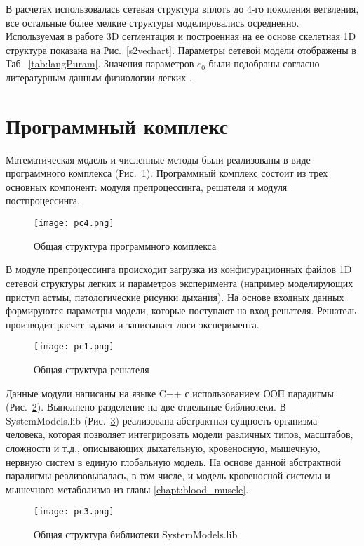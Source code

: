 В расчетах использовалась сетевая структура вплоть до 4-го поколения ветвления, все остальные более мелкие структуры моделировались осредненно. Используемая в работе 3D сегментация и построенная на ее основе скелетная 1D структура показана на  Рис.~\ref{s2vechart}. Параметры сетевой модели отображены в Таб.~\ref{tab:langPuram}. Значения параметров $c_{0} $ были подобраны согласно литературным данным физиологии легких \cite{schmidt,Mead1961}.

\section{Программный комплекс}
\label{lung:soft}
Математическая модель и численные методы были реализованы в виде программного комплекса (Рис.~\ref{fig:soft_lung}). Программный комплекс состоит из трех основных компонент: модуля препроцессинга, решателя и модуля постпроцессинга. 
\begin{figure}[!ht]
	\centering
	\texttt{[image: pc4.png]}
	\caption{Общая структура программного комплекса} \label{fig:soft_lung}
\end{figure}
В модуле препроцессинга происходит загрузка из конфигурационных файлов 1D сетевой структуры легких и параметров эксперимента (например моделирующих приступ астмы, патологические рисунки дыхания). На основе входных данных формируются параметры модели, которые поступают на вход решателя. Решатель производит расчет задачи и записывает логи эксперимента.
\begin{figure}[!ht]
	\centering
	\texttt{[image: pc1.png]}
	\caption{Общая структура решателя} \label{fig:soft_solver}
\end{figure}
Данные модули написаны на языке C++ с использованием ООП парадигмы (Рис.~\ref{fig:soft_solver}). Выполнено разделение на две отдельные библиотеки.  В SystemModels.lib (Рис.~\ref{fig:soft_systems}) реализована абстрактная сущность организма человека, которая позволяет интегрировать  модели различных типов, масштабов, сложности и т.д., описывающих дыхательную, кровеносную, мышечную, нервную систем в единую глобальную модель. На основе данной абстрактной парадигмы реализовывалась, в том числе, и модель кровеносной системы и мышечного метаболизма из главы \ref{chapt:blood_muscle}.  
\begin{figure}[!ht]
	\centering
	\texttt{[image: pc3.png]}
	\caption{Общая структура библиотеки SystemModels.lib} \label{fig:soft_systems}
\end{figure}

